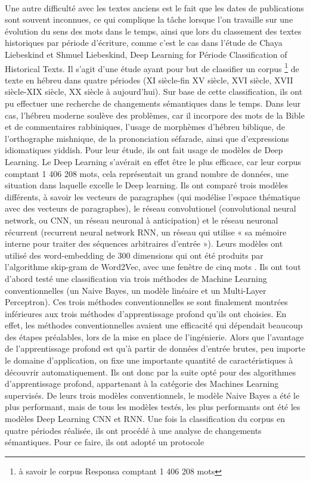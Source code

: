 \documentclass{article}
\begin{document}
\paragraph{}
Une autre difficulté avec les textes anciens est le fait que les dates de publications sont souvent inconnues, ce qui complique la tâche lorsque l’on travaille sur une évolution du sens des mots dans le temps, ainsi que lors du classement des textes historiques par période d’écriture, comme c’est le cas dans l’étude de Chaya Liebeskind et Shmuel Liebeskind, Deep Learning for Période Classification of Historical Texts. Il s’agit d’une étude ayant pour but de classifier un corpus \footnote{à savoir le corpus Responsa comptant 1 406 208 mots} de texte en hébreu dans quatre périodes (XI siècle-fin XV siècle, XVI siècle, XVII siècle-XIX siècle, XX siècle à aujourd’hui). Sur base de cette classification, ils ont pu effectuer une recherche de changements sémantiques dans le temps. Dans leur cas, l’hébreu moderne soulève des problèmes, car il incorpore des mots de la Bible et de commentaires rabbiniques, l’usage de morphèmes d’hébreu biblique, de l’orthographe mishnique, de la prononciation séfarade, ainsi que d’expressions idiomatiques yiddish. Pour leur étude, ils ont fait usage de modèles de Deep Learning. Le Deep Learning s’avérait en effet être le plus efficace, car leur corpus comptant 1 406 208 mots, cela représentait un grand nombre de données, une situation dans laquelle excelle le Deep learning. Ils ont comparé trois modèles différents, à savoir les vecteurs de paragraphes (qui modélise l’espace thématique avec des vecteurs de paragraphes), le réseau convolutionel (convolutional neural network, ou CNN, un réseau neuronal à anticipation) et le réseau neuronal récurrent (recurrent neural network RNN, un réseau qui utilise « sa mémoire interne pour traiter des séquences arbitraires d’entrée »\cite{liebeskind2020deep}). Leurs modèles ont utilisé des word-embedding de 300 dimensions qui ont été produits par l’algorithme skip-gram de Word2Vec, avec une fenêtre de cinq mots . Ils ont tout d’abord testé une classification via trois méthodes de Machine Learning conventionnelles (un Naive Bayes, un modèle linéaire et un Multi-Layer Perceptron). Ces trois méthodes conventionnelles se sont finalement montrées inférieures aux trois méthodes d’apprentissage profond qu’ils ont choisies. En effet, les méthodes conventionnelles avaient une efficacité qui dépendait beaucoup des étapes préalables, lors de la mise en place de l’ingénierie. Alors que l’avantage de l’apprentissage profond est qu’à partir de données d’entrée brutes, peu importe le domaine d’application, on fixe une importante quantité de caractéristiques à découvrir automatiquement. Ils ont donc par la suite opté pour des algorithmes d’apprentissage profond, appartenant à la catégorie des Machines Learning supervisés. De leurs trois modèles conventionnels, le modèle Naive Bayes a été le plus performant, mais de tous les modèles testés, les plus performants ont été les modèles Deep Learning CNN et RNN. Une fois la classification du corpus en quatre périodes réalisée, ils ont procédé à une analyse de changements sémantiques. Pour ce faire, ils ont adopté un protocole 
\end{document}
